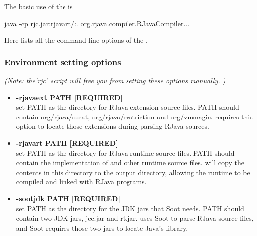 \documentclass[12pt]{article}
\begin{document}
The basic use of the \rjcfull is
\begin{cmd}
java -cp rjc.jar:rjava\textunderscore rt/:. org.rjava.compiler.RJavaCompiler...
\end{cmd}

\noindent
Here lists all the command line options of the \rjcfull. 

\subsubsection*{Environment setting options}
\emph{(Note: the`rjc' script will free you from setting these options manually. )}
\begin{itemize}
\item
\textbf{-rjava\textunderscore ext PATH [REQUIRED] \\}
set PATH as the directory for RJava extension source files. PATH should contain
org/rjava/osext, org/rjava/restriction and org/vmmagic. \rjc requires this option 
to locate those extensions during parsing RJava sources.
\item
\textbf{-rjava\textunderscore rt PATH [REQUIRED] \\}
set PATH as the directory for RJava runtime source files. PATH should contain
the implementation of  and other runtime source files. 
\rjc will copy the contents in this directory to the output directory, allowing
the runtime to be compiled and linked with RJava programs. 
\item
\textbf{-soot\textunderscore jdk PATH [REQUIRED] \\}
set PATH as the directory for the JDK jars that Soot needs. PATH should contain
two JDK jars, jce.jar and rt.jar. \rjc uses Soot to parse RJava source files, 
and Soot requires those two jars to locate Java's library. 
\end{itemize}
\end{document}
